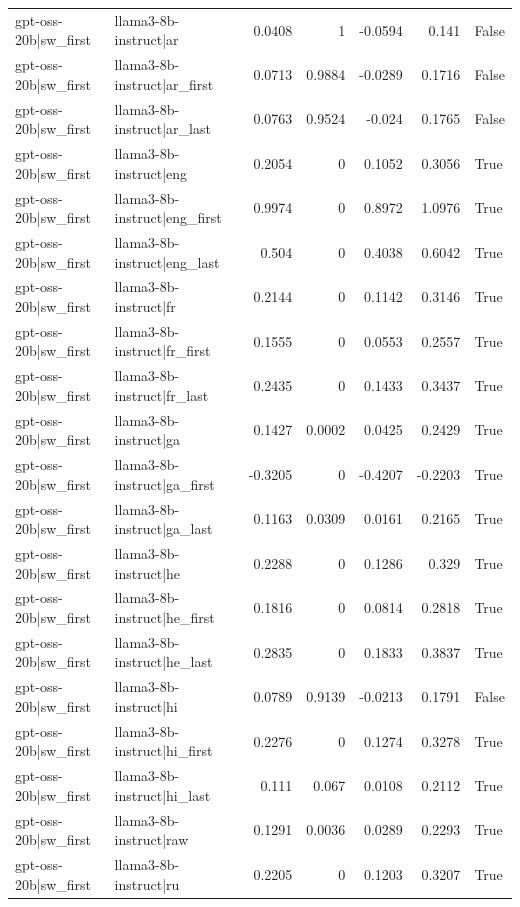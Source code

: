 \begin{table}
\begin{tabular}{l l r r r r l}
gpt-oss-20b|sw_first & llama3-8b-instruct|ar & 0.0408 & 1 & -0.0594 & 0.141 & False \\
gpt-oss-20b|sw_first & llama3-8b-instruct|ar_first & 0.0713 & 0.9884 & -0.0289 & 0.1716 & False \\
gpt-oss-20b|sw_first & llama3-8b-instruct|ar_last & 0.0763 & 0.9524 & -0.024 & 0.1765 & False \\
gpt-oss-20b|sw_first & llama3-8b-instruct|eng & 0.2054 & 0 & 0.1052 & 0.3056 & True \\
gpt-oss-20b|sw_first & llama3-8b-instruct|eng_first & 0.9974 & 0 & 0.8972 & 1.0976 & True \\
gpt-oss-20b|sw_first & llama3-8b-instruct|eng_last & 0.504 & 0 & 0.4038 & 0.6042 & True \\
gpt-oss-20b|sw_first & llama3-8b-instruct|fr & 0.2144 & 0 & 0.1142 & 0.3146 & True \\
gpt-oss-20b|sw_first & llama3-8b-instruct|fr_first & 0.1555 & 0 & 0.0553 & 0.2557 & True \\
gpt-oss-20b|sw_first & llama3-8b-instruct|fr_last & 0.2435 & 0 & 0.1433 & 0.3437 & True \\
gpt-oss-20b|sw_first & llama3-8b-instruct|ga & 0.1427 & 0.0002 & 0.0425 & 0.2429 & True \\
gpt-oss-20b|sw_first & llama3-8b-instruct|ga_first & -0.3205 & 0 & -0.4207 & -0.2203 & True \\
gpt-oss-20b|sw_first & llama3-8b-instruct|ga_last & 0.1163 & 0.0309 & 0.0161 & 0.2165 & True \\
gpt-oss-20b|sw_first & llama3-8b-instruct|he & 0.2288 & 0 & 0.1286 & 0.329 & True \\
gpt-oss-20b|sw_first & llama3-8b-instruct|he_first & 0.1816 & 0 & 0.0814 & 0.2818 & True \\
gpt-oss-20b|sw_first & llama3-8b-instruct|he_last & 0.2835 & 0 & 0.1833 & 0.3837 & True \\
gpt-oss-20b|sw_first & llama3-8b-instruct|hi & 0.0789 & 0.9139 & -0.0213 & 0.1791 & False \\
gpt-oss-20b|sw_first & llama3-8b-instruct|hi_first & 0.2276 & 0 & 0.1274 & 0.3278 & True \\
gpt-oss-20b|sw_first & llama3-8b-instruct|hi_last & 0.111 & 0.067 & 0.0108 & 0.2112 & True \\
gpt-oss-20b|sw_first & llama3-8b-instruct|raw & 0.1291 & 0.0036 & 0.0289 & 0.2293 & True \\
gpt-oss-20b|sw_first & llama3-8b-instruct|ru & 0.2205 & 0 & 0.1203 & 0.3207 & True \\

\end{tabular}
\end{table}
